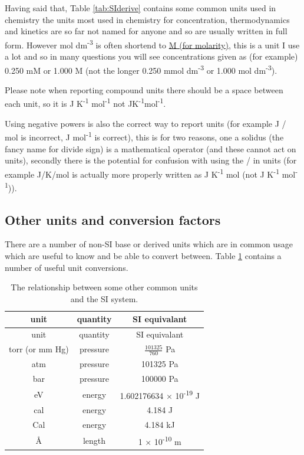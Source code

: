 \documentclass[
]{book}
\begin{document}
Having said that, Table \ref{tab:SIderive} contains some common units used in chemistry the units most used in chemistry for concentration, thermodynamics and kinetics are so far not named for anyone and so are usually written in full form. However mol dm\textsuperscript{-3} is often shortend to \href{https://goldbook.iupac.org/terms/view/A00295}{M (for molarity)}, this is a unit I use a lot and so in many questions you will see concentrations given as (for example) 0.250 mM or 1.000 M (not the longer 0.250 mmol dm\textsuperscript{-3} or 1.000 mol dm\textsuperscript{-3}).

Please note when reporting compound units there should be a space between each unit, so it is J K\textsuperscript{-1} mol\textsuperscript{-1} not JK\textsuperscript{-1}mol\textsuperscript{-1}.

Using negative powers is also the correct way to report units (for example J / mol is incorrect, J mol\textsuperscript{-1} is correct), this is for two reasons, one a solidus (the fancy name for divide sign) is a mathematical operator (and these cannot act on units), secondly there is the potential for confusion with using the / in units (for example J/K/mol is actually more properly written as J K\textsuperscript{-1} mol (not J K\textsuperscript{-1} mol\textsuperscript{-1})).

\hypertarget{other-units-and-conversion-factors}{%
\subsection{Other units and conversion factors}\label{other-units-and-conversion-factors}}

There are a number of non-SI base or derived units which are in common usage which are useful to know and be able to convert between. Table \ref{tab:nonSI} contains a number of useful unit conversions.

\begin{longtable}[]{@{}ccc@{}}
\caption{\label{tab:nonSI} The relationship between some other common units and the SI system.}\tabularnewline
\toprule
unit & quantity & SI equivalant \\
\midrule
\endfirsthead
\toprule
unit & quantity & SI equivalant \\
\midrule
\endhead
torr (or mm Hg) & pressure & \(\frac{101325}{760}\) Pa \\
atm & pressure & 101325 Pa \\
bar & pressure & 100000 Pa \\
eV & energy & 1.602176634 × 10\textsuperscript{-19} J \\
cal & energy & 4.184 J \\
Cal & energy & 4.184 kJ \\
Å & length & 1 × 10\textsuperscript{-10} m \\
\bottomrule
\end{longtable}
\end{document}
